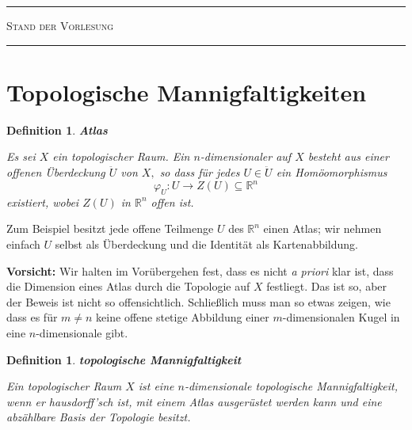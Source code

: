 \documentclass[12pt]{scrbook}   %
\newtheorem{definiX}[alles]{Definition}
\newenvironment{defini}[1]{\begin{definiX}{\bf #1}\par\rm}{\end{definiX}}
\begin{document}
\hrule\textsc{Stand der Vorlesung}\hrule
\section{Topologische Mannigfaltigkeiten}

\begin{defini} {\bf Atlas}

{\rm Es sei $X$ ein topologischer Raum. Ein $n$-dimensionaler 
 auf $X$ 
besteht aus einer offenen Überdeckung $\ddot U$ von $X,$ so dass für jedes 
$U\in \ddot U$ ein Homöomorphismus 
$$\varphi_U: U \longrightarrow Z(U)\subseteq \mathbb R^n$$
existiert, wobei $Z(U)$ in $\mathbb R^n$ offen ist.}

\end{defini}

Zum Beispiel besitzt jede offene Teilmenge $U$ des $\mathbb R^n$ einen Atlas; 
wir nehmen einfach $U$ selbst als Überdeckung und die Identität als
Kartenabbildung. 

{\bf Vorsicht:} Wir halten im Vorübergehen fest, dass es nicht {\it a
priori} klar ist, dass die Dimension eines Atlas durch die Topologie auf $X$
festliegt. Das ist so, aber der Beweis ist nicht so offensichtlich.
Schließlich muss man so etwas zeigen, wie dass es für $m\neq n$ keine 
offene stetige Abbildung einer $m$-dimensionalen Kugel in eine 
$n$-dimensionale gibt.

\begin{defini} {\bf topologische Mannigfaltigkeit}

{\rm Ein topologischer Raum $X$ ist eine $n$-dimensionale {\it topologische
Mannigfaltigkeit}, wenn er hausdorff'sch
ist, mit einem Atlas
ausgerüstet werden kann und eine abzählbare Basis der Topologie besitzt.
}

\end{defini}
\end{document}
